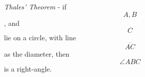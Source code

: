 \documentclass[preview]{standalone}
\begin{document}
\begin{center}
\textit{Thales' Theorem} - if $$A,B$$, and $$C$$ lie on a circle, with line $$\overline{AC}$$ as the diameter, then $$\angle ABC$$ is a right-angle.
\end{center}
\end{document}
